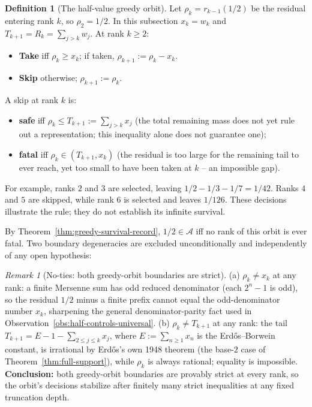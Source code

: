 \documentclass[11pt]{article}
\theoremstyle{plain}
\theoremstyle{definition}
\newtheorem{defn}[thm]{Definition}
\theoremstyle{remark}
\newtheorem{rem}[thm]{Remark}
\begin{document}
\begin{defn}[The half-value greedy orbit]
\label{defn:greedy-orbit}
Let $\rho_k=r_{k-1}(1/2)$ be the residual entering rank $k$, so
$\rho_2=1/2$.  In this subsection $x_k=w_k$ and
$T_{k+1}=R_k=\sum_{j>k}w_j$.  At rank $k\ge2$:
\begin{itemize}[nosep]
\item \textbf{Take} iff $\rho_k \ge x_k$; if taken, $\rho_{k+1} := \rho_k - x_k$.
\item \textbf{Skip} otherwise; $\rho_{k+1} := \rho_k$.
\end{itemize}
A skip at rank $k$ is:
\begin{itemize}[nosep]
\item \textbf{safe} iff $\rho_k \le T_{k+1} := \sum_{j>k} x_j$
(the total remaining mass does not yet rule out a representation; this
inequality alone does not guarantee one);
\item \textbf{fatal} iff $\rho_k \in (T_{k+1}, x_k)$ (the residual is too large for the remaining
tail to ever reach, yet too small to have been taken at $k$ -- an impossible gap).
\end{itemize}
\end{defn}

For example, ranks $2$ and $3$ are selected, leaving
$1/2-1/3-1/7=1/42$.  Ranks $4$ and $5$ are skipped, while rank $6$
is selected and leaves $1/126$.  These decisions illustrate the rule;
they do not establish its infinite survival.

By Theorem~\ref{thm:greedy-survival-record}, $1/2 \in \mathcal{A}$ iff no rank of this orbit is ever fatal.
Two boundary degeneracies are excluded unconditionally and independently of any open hypothesis:

\begin{rem}[No-ties: both greedy-orbit boundaries are strict]
\label{rem:no-ties}
(a) $\rho_k \ne x_k$ at any rank: a finite Mersenne sum has odd reduced denominator (each $2^n-1$ is
odd), so the residual $1/2$ minus a finite prefix cannot equal the odd-denominator
number $x_k$, sharpening the general
denominator-parity fact used in Observation~\ref{obs:half-controls-universal}.
(b) $\rho_k \ne T_{k+1}$ at any rank: the tail $T_{k+1} = E - 1 - \sum_{2 \le j \le k} x_j$, where
$E := \sum_{n\ge1} x_n$ is the Erd\H{o}s--Borwein constant, is irrational by Erd\H{o}s's own 1948
theorem (the base-$2$ case of Theorem~\ref{thm:full-support}), while $\rho_k$ is always rational;
equality is impossible. \textbf{Conclusion:} both greedy-orbit boundaries are provably strict at
every rank, so the orbit's decisions stabilize after finitely many strict inequalities at any fixed
truncation depth.
\end{rem}
\end{document}
